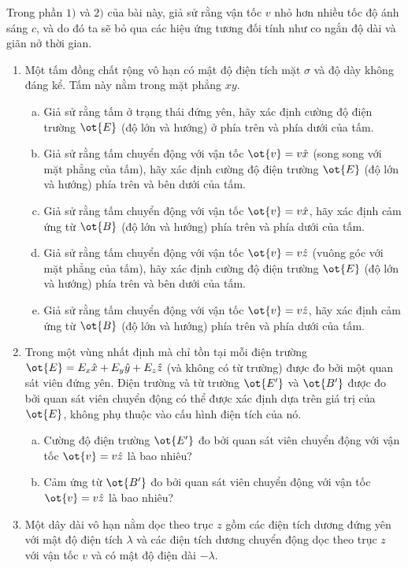 \begin{vd}
Trong phần $1)$ và $2)$ của bài này, giả sử rằng vận tốc $v$ nhỏ hơn nhiều tốc độ ánh sáng $c$, và do đó ta sẽ bỏ qua các hiệu ứng tương đối tính như co ngắn độ dài và giãn nở thời gian.
\begin{enumerate}[1)]
    \item Một tấm đồng chất rộng vô hạn có mật độ điện tích mặt $\sigma$ và độ dày không đáng kể. Tấm này nằm trong mặt phẳng $xy$.
    \begin{enumerate}[a)]
        \item Giả sử rằng tấm ở trạng thái đứng yên, hãy xác định cường độ điện trường $\ot{E}$ (độ lớn và hướng) ở phía trên và phía dưới của tấm.
        \item Giả sử rằng tấm chuyển động với vận tốc $\ot{{v}}=v\hat{{x}}$ (song song với mặt phẳng của tấm), hãy xác định cường độ điện trường $\ot{{E}}$ (độ lớn và hướng) phía trên và bên dưới của tấm.
        \item Giả sử rằng tấm chuyển động với vận tốc $\ot{{v}}=v\hat{{x}}$, hãy xác định cảm ứng từ $\ot{{B}}$ (độ lớn và hướng) phía trên và phía dưới của tấm.
        \item Giả sử rằng tấm chuyển động với vận tốc $\ot{{v}}=v\hat{{z}}$ (vuông góc với mặt phẳng của tấm), hãy xác định cường độ điện trường $\ot{{E}}$ (độ lớn và hướng) phía trên và bên dưới của tấm.
        \item Giả sử rằng tấm chuyển động với vận tốc $\ot{{v}}=v\hat{{z}}$, hãy xác định cảm ứng từ $\ot{{B}}$ (độ lớn và hướng) phía trên và phía dưới của tấm.
    \end{enumerate}
    \item Trong một vùng nhất định mà chỉ tồn tại mỗi điện trường $\ot{{E}}=E_x\hat{{x}}+E_y\hat{{y}}+E_z\hat{{z}}$ (và không có từ trường) được đo bởi một quan sát viên đứng yên. Điện trường và từ trường $\ot{{E'}}$ và $\ot{{B'}}$ được đo bởi quan sát viên chuyển động có thể được xác định dựa trên giá trị của $\ot{{E}}$, không phụ thuộc vào cấu hình điện tích của nó.
    \begin{enumerate}[a)]
        \item Cường độ điện trường $\ot{{E'}}$ đo bởi quan sát viên chuyển động với vận tốc $\ot{{v}}=v\hat{{z}}$ là bao nhiêu?
        \item Cảm ứng từ $\ot{{B'}}$ đo bởi quan sát viên chuyển động với vận tốc $\ot{{v}}=v\hat{{z}}$ là bao nhiêu?
    \end{enumerate}
    \item Một dây dài vô hạn nằm dọc theo trục $z$ gồm các điện tích dương đứng yên với mật độ điện tích $\lambda$ và các điện tích dương chuyển động dọc theo trục $z$ với vận tốc $v$ và có mật độ điện dài $-\lambda$.

\end{enumerate}
\end{vd}
